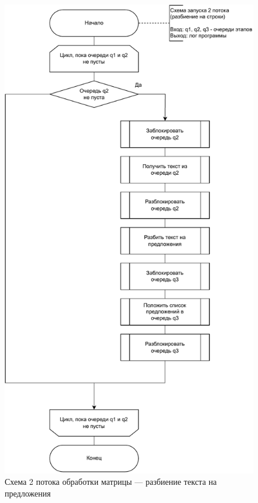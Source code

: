 \begin{figure}[h!]
	\centering
	\includegraphics[width=0.75\linewidth]{img/thread2}
	\caption{Схема 2 потока обработки матрицы --- разбиение текста на предложения}
	\label{fig:thread2}
\end{figure}
\clearpage
